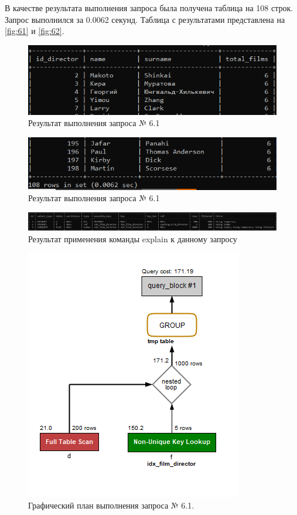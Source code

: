 \documentclass[11pt,a4paper,final]{article} %
\begin{document}
\par В качестве результата выполнения запроса была получена таблица на 108 строк. Запрос выполнился за 0.0062 секунд. Таблица с результатами представлена на \autoref{fig:61} и \autoref{fig:62}.

\begin{figure}[H]
	\centering
	\includegraphics[width=0.7\linewidth]{61.png}
	\caption{Результат выполнения запроса № 6.1}
	\label{fig:61}
\end{figure}

\begin{figure}[H]
	\centering
	\includegraphics[width=0.7\linewidth]{62.png}
	\caption{Результат выполнения запроса № 6.1}
	\label{fig:62}
\end{figure}

\begin{figure}[H]
	\centering
	\includegraphics[width=1.0\linewidth]{e61.png}
	\caption{Результат применения команды explain к данному запросу}
	\label{fig:e61}
\end{figure}

\begin{figure}[H]
	\centering
	\includegraphics[width=0.6\linewidth]{ex61.png}
	\caption{Графический план выполнения запроса № 6.1.}
	\label{fig:ex61}
\end{figure}
\end{document}

